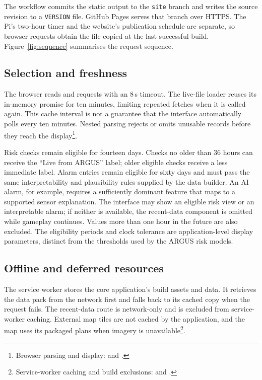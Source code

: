 \documentclass[10pt,a4paper]{article}
\begin{document}
The workflow commits the static output to the \texttt{site} branch and writes the source revision to a \texttt{VERSION} file. GitHub Pages serves that branch over HTTPS. The Pi's two-hour timer and the website's publication schedule are separate, so browser requests obtain the file copied at the last successful build. Figure~\ref{fig:sequence} summarises the request sequence.

\subsection{Selection and freshness}
The browser reads  and requests  with an 8\,s timeout. The live-file loader reuses its in-memory promise for ten minutes, limiting repeated fetches when it is called again. This cache interval is not a guarantee that the interface automatically polls every ten minutes. Nested parsing rejects or omits unusable records before they reach the display\footnote{Browser parsing and display:  and .}.

Risk checks remain eligible for fourteen days. Checks no older than 36 hours can receive the ``Live from ARGUS'' label; older eligible checks receive a less immediate label. Alarm entries remain eligible for sixty days and must pass the same interpretability and plausibility rules supplied by the data builder. An AI alarm, for example, requires a sufficiently dominant feature that maps to a supported sensor explanation. The interface may show an eligible risk view or an interpretable alarm; if neither is available, the recent-data component is omitted while gameplay continues. Values more than one hour in the future are also excluded. The eligibility periods and clock tolerance are application-level display parameters, distinct from the thresholds used by the ARGUS risk models.

\subsection{Offline and deferred resources}
The service worker stores the core application's build assets and data. It retrieves the data pack from the network first and falls back to its cached copy when the request fails. The recent-data route is network-only and is excluded from service-worker caching. External map tiles are not cached by the application, and the map uses its packaged plans when imagery is unavailable\footnote{Service-worker caching and build exclusions:  and .}.
\end{document}
